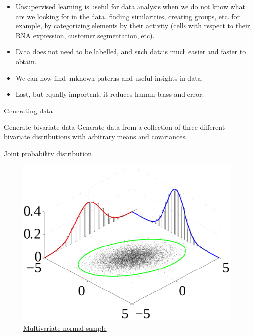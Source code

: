 \documentclass{beamer}
\begin{document}
\begin{frame}
    \begin{itemize}
        \item Unsupervised learning is useful for data analysis when we do not know what are we looking for in the data. finding similarities, creating groups, etc. for example, by categorizing elements by their activity (cells with respect to their RNA expression, customer segmentation, etc).
        \item Data does not need to be labelled, and such datais much easier and faster to obtain.
        \item We can now find unknown paterns and useful insights in data.
        \item Last, but equally important, it reduces human biass and error.
    \end{itemize}
\end{frame}



\begin{frame}{Generating data}
    \begin{Exercise}{Generate bivariate data}
        Generate data from a collection of three different bivariate distributions with arbitrary means and covariances.
    \end{Exercise}
\end{frame}


\begin{frame}{Joint probability distribution}
    \begin{figure}
        \includegraphics[width=0.6\linewidth]{Multivariate_normal_sample}
        \caption{\href{https://commons.wikimedia.org/wiki/File:Multivariate_normal_sample.svg}{Multivariate normal sample}}
    \end{figure}
\end{frame}
\end{document}
